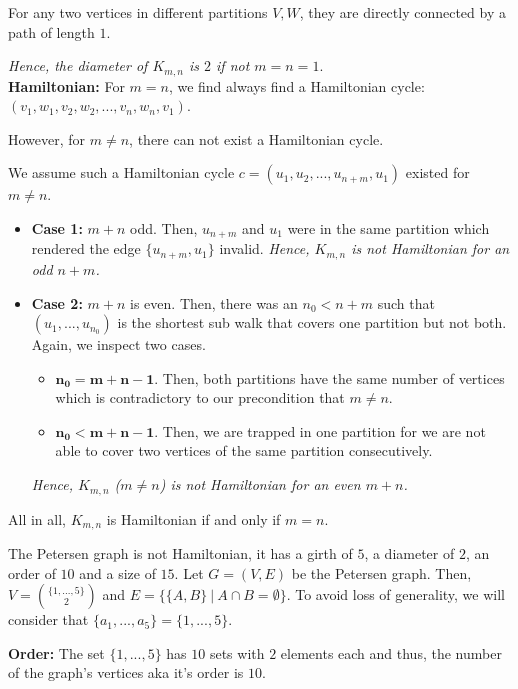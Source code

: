\documentclass[a4paper]{article}
\begin{document}
\begin{solution}{9}
\begin{theorem}
				For any two vertices in different partitions $V, W$, they are directly connected by a path of length $1$.

				 \emph{Hence, the diameter of $K_{m,n}$ is $2$ if not $m = n = 1$}.\\

			\textbf{Hamiltonian:} For $m = n$, we find always find a Hamiltonian cycle: $(v_1, w_1, v_2, w_2, ..., v_n, w_n, v_1)$.

				However, for $m \neq n$, there can not exist a Hamiltonian cycle.

				We assume such a Hamiltonian cycle $c = (u_1, u_2, ..., u_{n+m}, u_1)$ existed for $m \neq n$. 
				\begin{itemize}
					\item \textbf{Case 1:} $m + n$ odd. Then, $u_{n+m}$ and $u_1$ were in the same partition which rendered the edge $\{u_{n+m}, u_1\}$ invalid. \emph{Hence, $K_{m,n}$ is not Hamiltonian for an odd $n + m$.}
					\item \textbf{Case 2:} $m + n$ is even. Then, there was an $n_0 < n+m$ such that $(u_1, ..., u_{n_0})$ is the shortest sub walk that covers one partition but not both. Again, we inspect two cases.
						\begin{itemize}
							\item $\mathbf{n_0 = m + n - 1}$. Then, both partitions have the same number of vertices which is contradictory to our precondition that $m \neq n$.
							\item $\mathbf{n_0 < m + n - 1}$. Then, we are trapped in one partition for we are not able to cover two vertices of the same partition consecutively.
						\end{itemize}
					\emph{Hence, $K_{m, n}$ ($m \neq n$) is not Hamiltonian for an even $m + n$.}
				\end{itemize}

				All in all, $K_{m,n}$ is Hamiltonian if and only if $m = n$.
		\end{theorem}
			
		\newpage

		\begin{theorem}{The Petersen graph is not Hamiltonian, it has a girth of $5$, a diameter of $2$, an order of $10$ and a size of $15$.}
			Let $G = (V, E)$ be the Petersen graph. Then, $V = \binom{\{1, ..., 5\}}{2}$ and $E = \{\{A, B\}\ |\ A \cap B = \emptyset\}$. To avoid loss of generality, we will consider that $\{a_1, ..., a_5\} = \{1, ..., 5\}$.
			
			\textbf{Order:} The set $\{1, ..., 5\}$ has $10$ sets with $2$ elements each and thus, the number of the graph's vertices aka it's order is $10$.\\
			

\end{theorem}
\end{solution}
\end{document}
